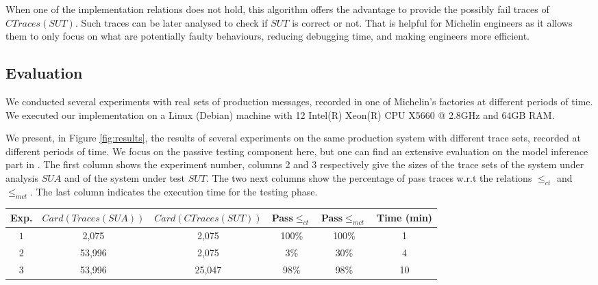 When one of the implementation relations does not hold, this algorithm
offers the advantage to provide the possibly fail traces of
$CTraces({SUT})$. Such traces can be later analysed to check if
$\mathit{SUT}$ is correct or not. That is helpful for Michelin engineers
as it allows them to only focus on what are potentially faulty
behaviours, reducing debugging time, and making engineers more
efficient.


\subsection{Evaluation}
\label{sec:impl-exp}

We conducted several experiments with real sets of production
messages, recorded in one of Michelin's factories at different
periods of time. We executed our implementation on a Linux
(Debian) machine with 12 Intel(R) Xeon(R) CPU X5660 @ 2.8GHz and
64GB RAM.

We present, in Figure \ref{fig:results}, the results of several
experiments on the same production system with different trace
sets, recorded at different periods of time. We focus on the
passive testing component here, but one can find an extensive
evaluation on the model inference part in
\cite{DBLP:conf/debs/SalvaD15}. The first column shows the experiment
number, columns 2 and 3 respectively give the sizes of the trace
sets of the system under analysis $\mathit{SUA}$ and of the system under
test $\mathit{SUT}$. The two next columns show the percentage of pass
traces w.r.t the relations $\leq_{ct}$ and $\leq_{mct}$. The last
column indicates the execution time for the testing phase.

\begin{figure*}
\begin{center}
\begin{tabular}{| c | c | c | c | c | c |}
\hline
Exp. & $Card(Traces({SUA}))$ & $Card(CTraces({SUT}))$ & Pass$\leq_{ct}$ & Pass$\leq_{mct}$ & Time (min)\\
\hline
\hline
$1$ & 2,075 & 2,075 & 100\% & 100\% & 1 \\
\hline
$2$ & 53,996 & 2,075 & 3\% & 30\% & 4\\
\hline
$3$ & 53,996 & 25,047 & 98\% & 98\% & 10\\
\hline
\end{tabular}
\end{center}

    \caption{Results of our testing method based on a same specification}
    \label{fig:results}
\end{figure*}

